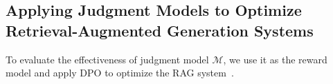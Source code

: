 

\subsection{Applying Judgment Models to Optimize Retrieval-Augmented Generation Systems}
\label{sec:3.3}
To evaluate the effectiveness of judgment model $\mathcal{M}$, we use it as the reward model and apply DPO to optimize the RAG system~\cite{rag-ddr2024Li}.


